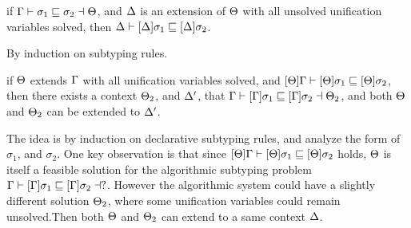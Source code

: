 \begin{conjecture}
  if $\Gamma {} \vdash \sigma_1 \sqsubseteq \sigma_2 \dashv \Theta$,
  and $\Delta$ is an extension of $\Theta$ with all unsolved unification
  variables solved,
  then $\Delta \vdash [\Delta] \sigma_1 \sqsubseteq [\Delta] \sigma_2$.
\end{conjecture}
\begin{hproof}
  By induction on subtyping rules.
\end{hproof}

\begin{conjecture}
  if $\Theta$ extends $\Gamma$ with all unification variables solved,
  and $[\Theta]\Gamma \vdash [\Theta] \sigma_1 \sqsubseteq [\Theta]\sigma_2$,
  then there exists a context $\Theta_2$, and $\Delta'$,
  that $\Gamma \vdash [\Gamma] \sigma_1 \sqsubseteq [\Gamma]\sigma_2 \dashv \Theta_2$,
  and both $\Theta$ and $\Theta_2$ can be extended to $\Delta'$.
\end{conjecture}
\begin{hproof}
  The idea is by induction on
  declarative subtyping rules, and analyze the form of $\sigma_1$, and
  $\sigma_2$. One key observation is that since $[\Theta]\Gamma \vdash [\Theta]
  \sigma_1 \sqsubseteq [\Theta]\sigma_2$ holds, $\Theta$ is itself a feasible solution for
  the algorithmic subtyping problem $\Gamma
  \vdash [\Gamma] \sigma_1 \sqsubseteq [\Gamma]\sigma_2 \dashv ?$. However the algorithmic
  system could have a slightly different solution $\Theta_2$, where some
  unification variables could remain unsolved.Then both $\Theta$ and
  $\Theta_2$ can extend to a same context $\Delta$.
\end{hproof}